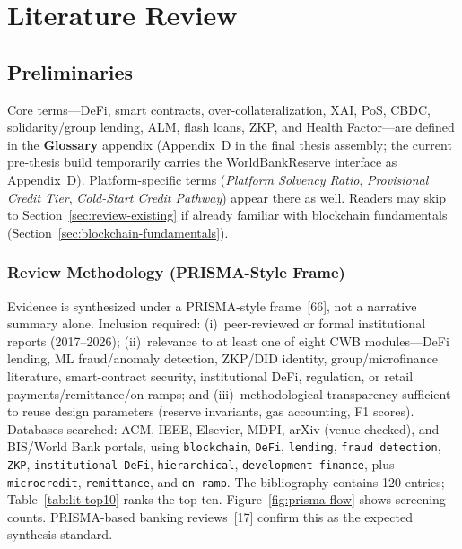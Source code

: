 \documentclass[12pt, a4paper]{report}
\begin{document}
\chapter{Literature Review}

\section{Preliminaries}
\label{sec:preliminaries}

Core terms---DeFi, smart contracts, over-collateralization, XAI, PoS, CBDC, solidarity/group lending, ALM, flash loans, ZKP, and Health Factor---are defined in the \textbf{Glossary} appendix (Appendix~D in the final thesis assembly; the current pre-thesis build temporarily carries the WorldBankReserve interface as Appendix~D). Platform-specific terms (\textit{Platform Solvency Ratio}, \textit{Provisional Credit Tier}, \textit{Cold-Start Credit Pathway}) appear there as well. Readers may skip to Section~\ref{sec:review-existing} if already familiar with blockchain fundamentals (Section~\ref{sec:blockchain-fundamentals}).

\subsection{Review Methodology (PRISMA-Style Frame)}
\label{sec:lit-prisma}

Evidence is synthesized under a PRISMA-style frame~[66], not a narrative summary alone. Inclusion required: (i)~peer-reviewed or formal institutional reports (2017--2026); (ii)~relevance to at least one of eight CWB modules---DeFi lending, ML fraud/anomaly detection, ZKP/DID identity, group/microfinance literature, smart-contract security, institutional DeFi, regulation, or retail payments/remittance/on-ramps; and (iii)~methodological transparency sufficient to reuse design parameters (reserve invariants, gas accounting, F1 scores). Databases searched: ACM, IEEE, Elsevier, MDPI, arXiv (venue-checked), and BIS/World Bank portals, using \texttt{blockchain}, \texttt{DeFi}, \texttt{lending}, \texttt{fraud detection}, \texttt{ZKP}, \texttt{institutional DeFi}, \texttt{hierarchical}, \texttt{development finance}, plus \texttt{microcredit}, \texttt{remittance}, and \texttt{on-ramp}. The bibliography contains 120 entries; Table~\ref{tab:lit-top10} ranks the top ten. Figure~\ref{fig:prisma-flow} shows screening counts. PRISMA-based banking reviews~[17] confirm this as the expected synthesis standard.
\end{document}
